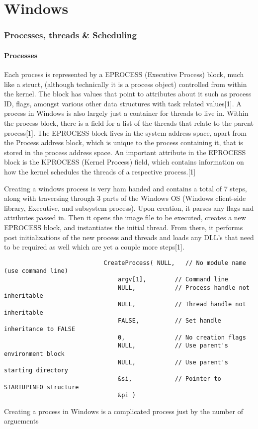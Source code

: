 \documentclass{article}
\begin{document}
\part{Windows}
\section{Processes, threads \& Scheduling}
\subsection{Processes}
    Each process is represented by a EPROCESS (Executive Process) block, much like a struct, (although technically it is a process object) controlled from within the kernel. The block has values that point to attributes about it such as process ID, flags, amongst various other data structures with task related values[1]. A process in Windows is also largely just a container for threads to live in. Within the process block, there is a field for a list of the threads that relate to the parent process[1].  The EPROCESS block lives in the system address space, apart from the Process address block, which is unique to the process containing it, that is stored in the process address space.  An important attribute in the EPROCESS block is the KPROCESS (Kernel Process) field, which contains information on how the kernel schedules the threads of a respective process.[1]

    Creating a windows process is very ham handed and contains a total of 7 steps, along with traversing through 3 parts of the Windows OS (Windows client-side library, Executive, and subsystem process). Upon creation, it parses any flags and attributes passed in. Then it opens the image file to be executed, creates a new EPROCESS block, and instantiates the initial thread. From there, it performs post initializations of the new process and threads and loads any DLL’s that need to be required as well which are yet a couple more steps[1]. \newpage

                              \begin{lstlisting}
                            CreateProcess( NULL,   // No module name (use command line)
                                argv[1],        // Command line
                                NULL,           // Process handle not inheritable
                                NULL,           // Thread handle not inheritable
                                FALSE,          // Set handle inheritance to FALSE
                                0,              // No creation flags
                                NULL,           // Use parent's environment block
                                NULL,           // Use parent's starting directory
                                &si,            // Pointer to STARTUPINFO structure
                                &pi )
                            \end{lstlisting}
                            Creating a process in Windows is a complicated process just by the number of arguements
\end{document}
